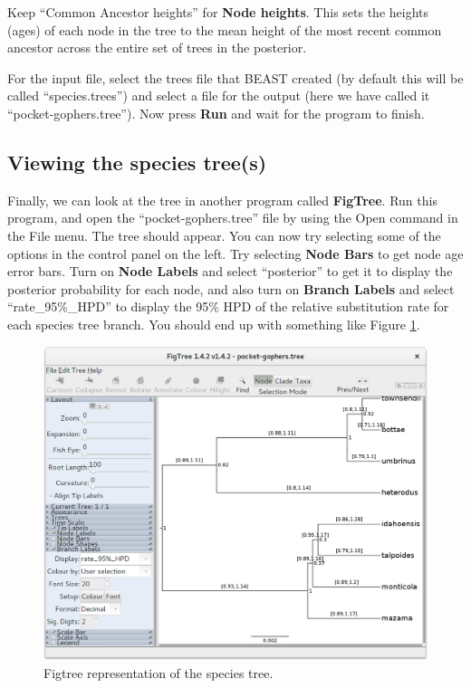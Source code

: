 \documentclass{article}
\begin{document}
Keep ``Common Ancestor heights'' for \textbf{Node heights}. This sets the
heights (ages) of each node in the tree to the mean height of the most recent
common ancestor across the entire set of trees in the posterior.

For the input file, select the trees file that BEAST created (by default this
will be called ``species.trees'') and select a file for the output (here we
have called it ``pocket-gophers.tree''). Now press \textbf{Run} and wait for the
program to finish.

\subsection*{Viewing the species tree(s)}

Finally, we can look at the tree in another program called \textbf{FigTree}. Run
this program, and open the ``pocket-gophers.tree'' file by using the Open command
in the File menu. The tree should appear. You can now try selecting some of the
options in the control panel on the left. Try selecting \textbf{Node Bars} to
get node age error bars. Turn on \textbf{Node Labels} and select
``posterior'' to get it to display the posterior probability for each node,
and also turn on \textbf{Branch Labels} and select ``rate\_95\%\_HPD'' to display
the 95\% HPD of the relative substitution rate for each species tree branch.
You should end up with something like Figure \ref{fig:figtree}.

\begin{figure}[htb!]
\centering
\includegraphics[width=\textwidth]{figures/figtree.png}
\caption{Figtree representation of the species tree.}
\label{fig:figtree}
\end{figure}
\end{document}
